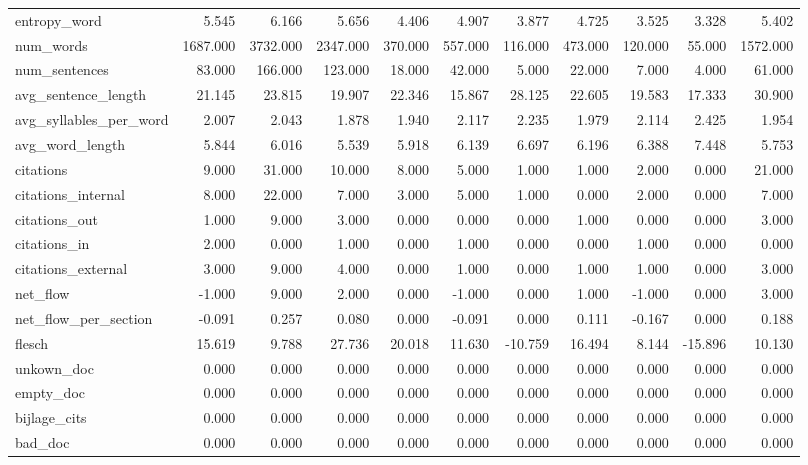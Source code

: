 \begin{tabular}{lrrrrrrrrrr}
\cline{1-11}
entropy\_word & 5.545 & 6.166 & 5.656 & 4.406 & 4.907 & 3.877 & 4.725 & 3.525 & 3.328 & 5.402 \\
\cline{1-11}
num\_words & 1687.000 & 3732.000 & 2347.000 & 370.000 & 557.000 & 116.000 & 473.000 & 120.000 & 55.000 & 1572.000 \\
\cline{1-11}
num\_sentences & 83.000 & 166.000 & 123.000 & 18.000 & 42.000 & 5.000 & 22.000 & 7.000 & 4.000 & 61.000 \\
\cline{1-11}
avg\_sentence\_length & 21.145 & 23.815 & 19.907 & 22.346 & 15.867 & 28.125 & 22.605 & 19.583 & 17.333 & 30.900 \\
\cline{1-11}
avg\_syllables\_per\_word & 2.007 & 2.043 & 1.878 & 1.940 & 2.117 & 2.235 & 1.979 & 2.114 & 2.425 & 1.954 \\
\cline{1-11}
avg\_word\_length & 5.844 & 6.016 & 5.539 & 5.918 & 6.139 & 6.697 & 6.196 & 6.388 & 7.448 & 5.753 \\
\cline{1-11}
citations & 9.000 & 31.000 & 10.000 & 8.000 & 5.000 & 1.000 & 1.000 & 2.000 & 0.000 & 21.000 \\
\cline{1-11}
citations\_internal & 8.000 & 22.000 & 7.000 & 3.000 & 5.000 & 1.000 & 0.000 & 2.000 & 0.000 & 7.000 \\
\cline{1-11}
citations\_out & 1.000 & 9.000 & 3.000 & 0.000 & 0.000 & 0.000 & 1.000 & 0.000 & 0.000 & 3.000 \\
\cline{1-11}
citations\_in & 2.000 & 0.000 & 1.000 & 0.000 & 1.000 & 0.000 & 0.000 & 1.000 & 0.000 & 0.000 \\
\cline{1-11}
citations\_external & 3.000 & 9.000 & 4.000 & 0.000 & 1.000 & 0.000 & 1.000 & 1.000 & 0.000 & 3.000 \\
\cline{1-11}
net\_flow & -1.000 & 9.000 & 2.000 & 0.000 & -1.000 & 0.000 & 1.000 & -1.000 & 0.000 & 3.000 \\
\cline{1-11}
net\_flow\_per\_section & -0.091 & 0.257 & 0.080 & 0.000 & -0.091 & 0.000 & 0.111 & -0.167 & 0.000 & 0.188 \\
\cline{1-11}
flesch & 15.619 & 9.788 & 27.736 & 20.018 & 11.630 & -10.759 & 16.494 & 8.144 & -15.896 & 10.130 \\
\cline{1-11}
unkown\_doc & 0.000 & 0.000 & 0.000 & 0.000 & 0.000 & 0.000 & 0.000 & 0.000 & 0.000 & 0.000 \\
\cline{1-11}
empty\_doc & 0.000 & 0.000 & 0.000 & 0.000 & 0.000 & 0.000 & 0.000 & 0.000 & 0.000 & 0.000 \\
\cline{1-11}
bijlage\_cits & 0.000 & 0.000 & 0.000 & 0.000 & 0.000 & 0.000 & 0.000 & 0.000 & 0.000 & 0.000 \\
\cline{1-11}
bad\_doc & 0.000 & 0.000 & 0.000 & 0.000 & 0.000 & 0.000 & 0.000 & 0.000 & 0.000 & 0.000 \\
\cline{1-11}
\bottomrule
\end{tabular}

